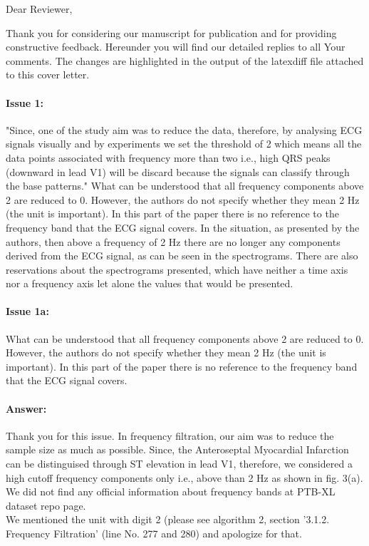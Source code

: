 \documentclass{article}
\begin{document}
Dear Reviewer,

\vspace{0.25in}

Thank you for considering our manuscript for publication and for providing constructive feedback.
Hereunder you will find our detailed replies to all Your comments.
The changes are highlighted in the output of the latexdiff file attached to this cover letter.


\paragraph{Issue 1:}
\begin{displayquote}
"Since, one of the study aim was to reduce the data, therefore, by analysing ECG signals visually and by experiments we set the threshold of 2 which means all the data points associated with frequency more than two i.e., high QRS peaks (downward in lead V1) will be discard because the signals can classify through the base patterns." What can be understood that all frequency components above 2 are reduced to 0. However, the authors do not specify whether they mean 2 Hz (the unit is important). In this part of the paper there is no reference to the frequency band that the ECG signal covers. In the situation, as presented by the authors, then above a frequency of 2 Hz there are no longer any components derived from the ECG signal, as can be seen in the spectrograms. There are also reservations about the spectrograms presented, which have neither a time axis nor a frequency axis let alone the values that would be presented.
\end{displayquote}


\paragraph{Issue 1a:}
\begin{displayquote}
What can be understood that all frequency components above 2 are reduced to 0. However, the authors do not specify whether they mean 2 Hz (the unit is important). In this part of the paper there is no reference to the frequency band that the ECG signal covers.
\end{displayquote}

\paragraph{Answer:}
Thank you for this issue. In frequency filtration, our aim was to reduce the sample size as much as possible. Since, the Anteroseptal Myocardial Infarction can be distinguised through ST elevation in lead V1, therefore, we considered a high cutoff frequency components only i.e., above than 2 Hz as shown in fig. 3(a). We did not find any official information about frequency bands at PTB-XL dataset repo page. \\
We mentioned the unit with digit 2 (please see algorithm 2, section '3.1.2. Frequency Filtration' (line No. 277 and 280) and apologize for that.  
\end{document}
